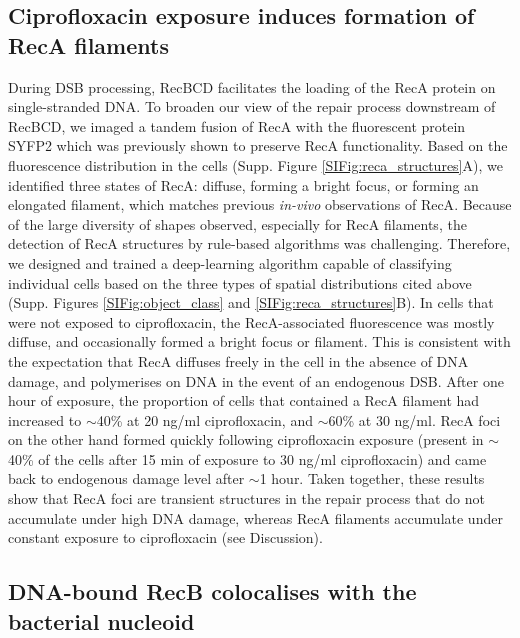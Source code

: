 \subsection*{Ciprofloxacin exposure induces formation of RecA filaments}
During DSB processing, RecBCD facilitates the loading of the RecA protein on single-stranded DNA. To broaden our view of the repair process down\-stream of RecBCD, we imaged a tandem fusion of RecA with the fluorescent protein SYFP2 which was previously shown to preserve RecA functionality\cite{Wiktor2021}. Based on the fluorescence distribution in the cells (Supp. Figure \ref{SIFig:reca_structures}A), we identified three states of RecA: diffuse, forming a bright focus, or forming an elongated filament, which matches previous \emph{in-vivo} observations of RecA\cite{Wiktor2021}. Because of the large diversity of shapes observed, especially for RecA filaments, the detection of RecA structures by rule-based algorithms was challenging. Therefore, we designed and trained a deep-learning algorithm capable of classifying individual cells based on the three types of spatial distributions cited above (Supp. Figures \ref{SIFig:object_class} and \ref{SIFig:reca_structures}B). In cells that were not exposed to ciprofloxacin, the RecA-associated fluorescence was mostly diffuse, and occasionally formed a bright focus or filament. This is consistent with the expectation that RecA diffuses freely in the cell in the absence of DNA damage, and polymerises on DNA in the event of an endogenous DSB. After one hour of exposure, the proportion of cells that contained a RecA filament had increased to $\sim$40\% at 20 ng/ml ciprofloxacin, and $\sim$60\% at 30 ng/ml. RecA foci on the other hand formed quickly following ciprofloxacin exposure (present in $\sim$40\% of the cells after 15 min of exposure to 30 ng/ml ciprofloxacin) and came back to endogenous damage level after $\sim$1 hour. Taken together, these results show that RecA foci are transient structures in the repair process that do not accumulate under high DNA damage, whereas RecA filaments accumulate under constant exposure to ciprofloxacin (see Discussion).

\subsection*{DNA-bound RecB colocalises with the bacterial nucleoid}

